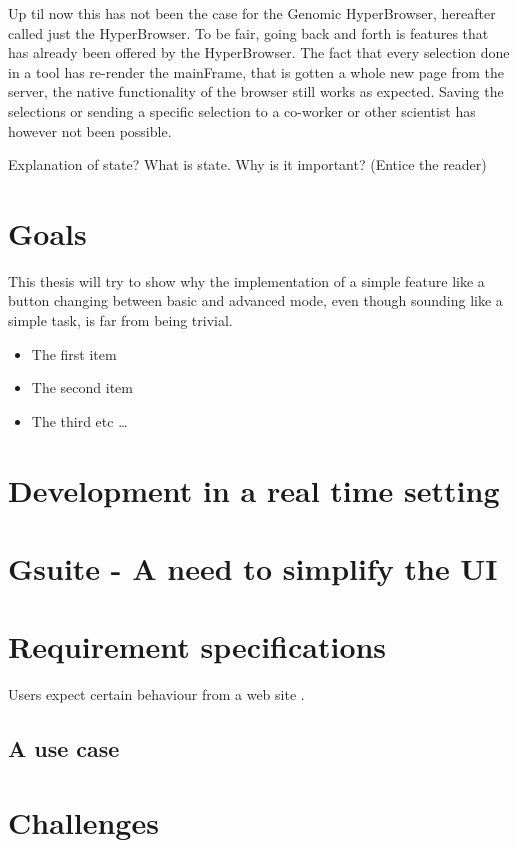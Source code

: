 \documentclass[english]{ifimaster}
\begin{document}
Up til now this has not been the case for the Genomic HyperBrowser, hereafter called just the HyperBrowser. To be fair, going back and forth is features that has already been offered by the HyperBrowser. The fact that every selection done in a tool has re-render the mainFrame, that is gotten a whole new page from the server, the native functionality of the browser still works as expected. Saving the selections or sending a specific selection to a co-worker or other scientist has however not been possible.


Explanation of state? What is state. Why is it important?
(Entice the reader)
\section{Goals}
This thesis will try to show why the implementation of a simple feature like a button changing between basic and advanced mode, even though sounding like a simple task, is far from being trivial.
\begin{itemize}
  \item The first item
  \item The second item
  \item The third etc \ldots
\end{itemize}
\section{Development in a real time setting}

\section{Gsuite - A need to simplify the UI}

\section{Requirement specifications}
Users expect certain behaviour from a web site \parencite{mik}.
\subsection{A use case}




\section{Challenges}
\end{document}
